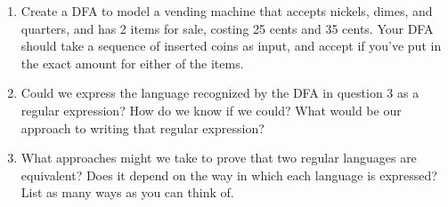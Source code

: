 \begin{enumerate}
	\newpage
\item Create a DFA to model a vending machine that accepts nickels, dimes, and quarters, and has 2 items for sale, costing 25 cents and 35 cents. Your DFA should take a sequence of inserted coins as input, and accept if you've put in the exact amount for either of the items.
		
\newpage
\item Could we express the language recognized by the DFA in question 3 as a regular expression? How do we know if we could? What would be our approach to writing that regular expression?
		
\newpage
\item What approaches might we take to prove that two regular languages are equivalent? Does it depend on the way in which each language is expressed? List as many ways as you can think of.
		
		
\end{enumerate}


